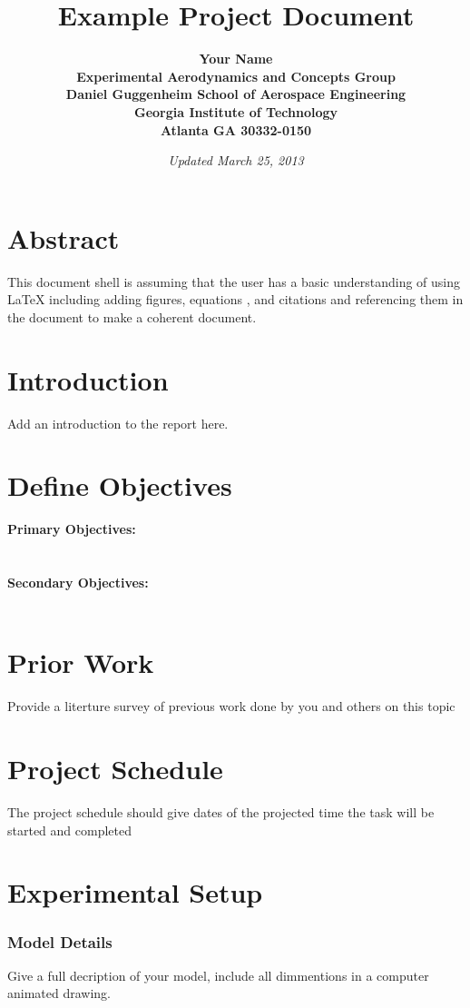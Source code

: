 \documentclass[12pt]{report} %
\title{\bf Example Project Document\\  }
\author{\bf Your Name
\\ Experimental Aerodynamics and Concepts Group
\\Daniel Guggenheim School of Aerospace Engineering
\\Georgia Institute of Technology
\\Atlanta GA 30332-0150
}
\date{\it Updated March 25, 2013} %
\begin{document}
\maketitle
 
\tableofcontents
 
\chapter{Abstract}

This document shell is assuming that the user has a basic understanding of using LaTeX including adding figures, equations , and citations and referencing them in the document to make a coherent document. 

\chapter{Introduction}
Add an introduction to the report here.

\chapter{Define Objectives}
 

{\bf Primary Objectives:} \\
\\ \\
{\bf Secondary Objectives:} \\
\\




\chapter{Prior Work}
Provide a literture survey of previous work done by you and others on this topic
\chapter{Project Schedule}
The project schedule should give dates of the projected time the task will be started and completed
\chapter{Experimental Setup}

\subsection{Model Details}
Give a full decription of your model, include all dimmentions in a computer animated drawing.
\end{document}
